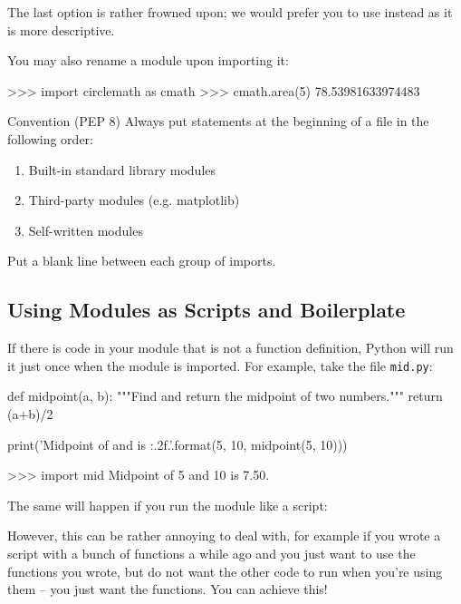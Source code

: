 \documentclass[11pt]{cselabheader}
\begin{document}
{The last option is rather frowned upon; we would prefer you to use
 instead as it is more descriptive.

You may also rename a module upon importing it:

\begin{pyconcode}
>>> import circlemath as cmath
>>> cmath.area(5)
78.53981633974483
\end{pyconcode}


\begin{infobox}{Convention (PEP 8)}
  Always put  statements at the beginning of a file in the
  following order:
  \begin{enumerate}
    \item Built-in standard library modules
    \item Third-party modules (e.g. matplotlib)
    \item Self-written modules
  \end{enumerate}
  Put a blank line between each group of imports.
\end{infobox}

\subsection{Using Modules as Scripts and Boilerplate}

If there is code in your module that is not a function definition, Python will
run it just once when the module is imported. For example, take the file
\texttt{mid.py}:

\begin{python3code}
def midpoint(a, b):
    """Find and return the midpoint of two numbers."""
    return (a+b)/2

print('Midpoint of {} and {} is {:.2f}.'.format(5, 10, midpoint(5, 10)))
\end{python3code}

\begin{pyconcode}
>>> import mid
Midpoint of 5 and 10 is 7.50.
\end{pyconcode}

The same will happen if you run the module like a script:


However, this can be rather annoying to deal with, for example if you wrote a
script with a bunch of functions a while ago and you just want to use the
functions you wrote, but do not want the other code to run when you're using
them -- you just want the functions. You can achieve this!

}
\end{document}

